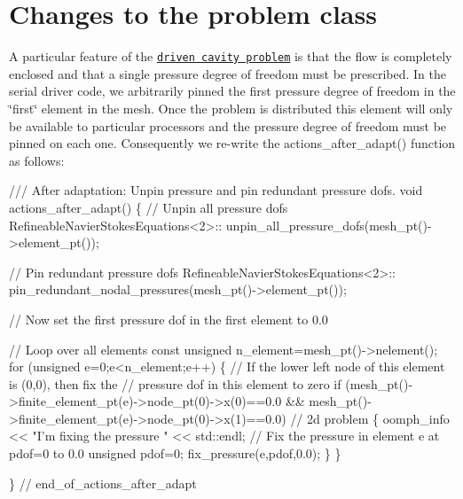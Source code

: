 \hypertarget{index_problem_class}{}\section{Changes to the problem class}\label{index_problem_class}
A particular feature of the \href{../../../navier_stokes/adaptive_driven_cavity/html/index.html}{\tt driven cavity problem} is that the flow is completely enclosed and that a single pressure degree of freedom must be prescribed. In the serial driver code, we arbitrarily pinned the first pressure degree of freedom in the \char`\"{}first\char`\"{} element in the mesh. Once the problem is distributed this element will only be available to particular processors and the pressure degree of freedom must be pinned on each one. Consequently we re-\/write the {\ttfamily actions\+\_\+after\+\_\+adapt()} function as follows\+:

 
\begin{DoxyCodeInclude}
 \textcolor{comment}{/// After adaptation: Unpin pressure and pin redundant pressure dofs.}
 \textcolor{keywordtype}{void} actions\_after\_adapt()
  \{
   \textcolor{comment}{// Unpin all pressure dofs}
   RefineableNavierStokesEquations<2>::
    unpin\_all\_pressure\_dofs(mesh\_pt()->element\_pt());
    
    \textcolor{comment}{// Pin redundant pressure dofs}
   RefineableNavierStokesEquations<2>::
    pin\_redundant\_nodal\_pressures(mesh\_pt()->element\_pt());
   
   \textcolor{comment}{// Now set the first pressure dof in the first element to 0.0}

   \textcolor{comment}{// Loop over all elements}
   \textcolor{keyword}{const} \textcolor{keywordtype}{unsigned} n\_element=mesh\_pt()->nelement();
   \textcolor{keywordflow}{for} (\textcolor{keywordtype}{unsigned} e=0;e<n\_element;e++)
    \{
     \textcolor{comment}{// If the lower left node of this element is (0,0), then fix the }
     \textcolor{comment}{// pressure dof in this element to zero}
     \textcolor{keywordflow}{if} (mesh\_pt()->finite\_element\_pt(e)->node\_pt(0)->x(0)==0.0 && 
         mesh\_pt()->finite\_element\_pt(e)->node\_pt(0)->x(1)==0.0) \textcolor{comment}{// 2d problem}
      \{
       oomph\_info << \textcolor{stringliteral}{"I'm fixing the pressure "} << std::endl;
       \textcolor{comment}{// Fix the pressure in element e at pdof=0 to 0.0}
       \textcolor{keywordtype}{unsigned} pdof=0;
       fix\_pressure(e,pdof,0.0);
      \}
    \}

  \} \textcolor{comment}{// end\_of\_actions\_after\_adapt}

\end{DoxyCodeInclude}


